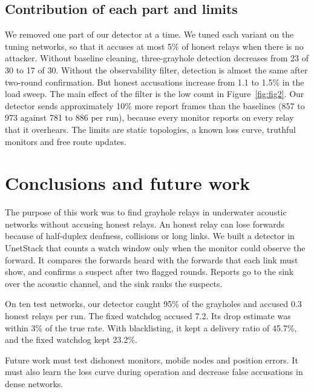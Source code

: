 \documentclass[11pt]{article}
\begin{document}
\subsection{Contribution of each part and limits}\label{sec:res-ablation}
\noindent
We removed one part of our detector at a time.
We tuned each variant on the tuning networks, so that it accuses at most 5\% of honest relays when there is no attacker.
Without baseline cleaning, three-grayhole detection decreases from 23 of 30 to 17 of 30.
Without the observability filter, detection is almost the same after two-round confirmation.
But honest accusations increase from 1.1 to 1.5\% in the load sweep.
The main effect of the filter is the low count in Figure~\ref{fig:fig2}.
Our detector sends approximately 10\% more report frames than the baselines (857 to 973 against 781 to 886 per run), because every monitor reports on every relay that it overhears.
The limits are static topologies, a known loss curve, truthful monitors and free route updates.

\section{Conclusions and future work}\label{sec:conclusion}
\noindent
The purpose of this work was to find grayhole relays in underwater acoustic networks without accusing honest relays.
An honest relay can lose forwards because of half-duplex deafness, collisions or long links.
We built a detector in UnetStack that counts a watch window only when the monitor could observe the forward.
It compares the forwards heard with the forwards that each link must show, and confirms a suspect after two flagged rounds.
Reports go to the sink over the acoustic channel, and the sink ranks the suspects.

On ten test networks, our detector caught 95\% of the grayholes and accused 0.3 honest relays per run.
The fixed watchdog accused 7.2.
Its drop estimate was within 3\% of the true rate.
With blacklisting, it kept a delivery ratio of 45.7\%, and the fixed watchdog kept 23.2\%.

Future work must test dishonest monitors, mobile nodes and position errors.
It must also learn the loss curve during operation and decrease false accusations in dense networks.
\end{document}
